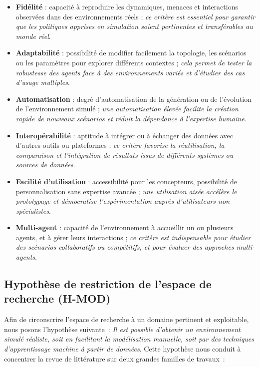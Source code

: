\begin{itemize}
  \item \textbf{Fidélité} : capacité à reproduire les dynamiques, menaces et interactions observées dans des environnements réels ; \emph{ce critère est essentiel pour garantir que les politiques apprises en simulation soient pertinentes et transférables au monde réel}.
  \item \textbf{Adaptabilité} : possibilité de modifier facilement la topologie, les scénarios ou les paramètres pour explorer différents contextes ; \emph{cela permet de tester la robustesse des agents face à des environnements variés et d'étudier des cas d'usage multiples}.
  \item \textbf{Automatisation} : degré d'automatisation de la génération ou de l'évolution de l'environnement simulé ; \emph{une automatisation élevée facilite la création rapide de nouveaux scénarios et réduit la dépendance à l'expertise humaine}.
  \item \textbf{Interopérabilité} : aptitude à intégrer ou à échanger des données avec d'autres outils ou plateformes ; \emph{ce critère favorise la réutilisation, la comparaison et l'intégration de résultats issus de différents systèmes ou sources de données}.
  \item \textbf{Facilité d'utilisation} : accessibilité pour les concepteurs, possibilité de personnalisation sans expertise avancée ; \emph{une utilisation aisée accélère le prototypage et démocratise l'expérimentation auprès d'utilisateurs non spécialistes}.
  \item \textbf{Multi-agent} : capacité de l'environnement à accueillir un ou plusieurs agents, et à gérer leurs interactions ; \emph{ce critère est indispensable pour étudier des scénarios collaboratifs ou compétitifs, et pour évaluer des approches multi-agents}.
\end{itemize}

\subsection*{Hypothèse de restriction de l'espace de recherche (\textbf{H-MOD})}

Afin de circonscrire l'espace de recherche à un domaine pertinent et exploitable, nous posons l'hypothèse suivante~: \textit{Il est possible d'obtenir un environnement simulé réaliste, soit en facilitant la modélisation manuelle, soit par des techniques d'apprentissage machine à partir de données}. Cette hypothèse nous conduit à concentrer la revue de littérature sur deux grandes familles de travaux~:

